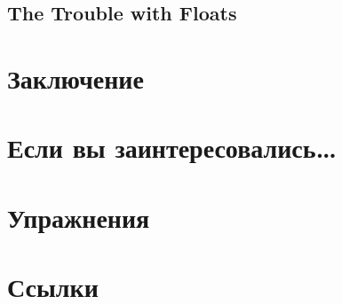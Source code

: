 \subsection{The Trouble with Floats}
\section{Заключение}
\section{Если вы заинтересовались…}
\section{Упражнения}
\section{Ссылки}





